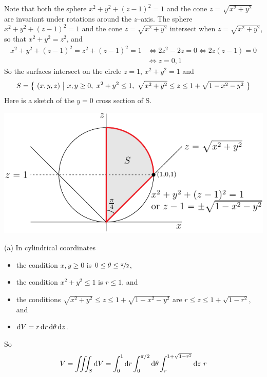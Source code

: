 \begin{solution}
Note that both the sphere $x^2+y^2+(z-1)^2=1$
and the cone $z=\sqrt{x^2+y^2}$  are invariant under rotations
around the $z$--axis. The sphere $x^2 + y^2 + (z-1)^2 = 1$ 
and the cone $z = \sqrt{x^2 + y^2}$ intersect when $z=\sqrt{x^2+y^2}$, so that
$x^2+y^2=z^2$, and
\begin{align*}
x^2 + y^2 + (z-1)^2 = z^2+(z-1)^2=1
&\iff 2z^2-2z=0
\iff 2z(z-1)=0 \\
&\iff z=0,1
\end{align*}
So the surfaces intersect on the circle $z=1$,
$x^2+y^2=1$ and
\begin{equation*}
S = \Set{(x,y,z)}{x,y\ge 0,\  x^2+y^2\le 1,\ 
         \sqrt{x^2+y^2}\le z\le 1+\sqrt{1-x^2-y^2}}
\end{equation*}
Here is a sketch of the $y=0$ cross section of S.
\begin{center}
     \includegraphics{fig/OE16D_7.pdf}
\end{center}

(a) In cylindrical coordinates
\begin{itemize}
\item
the condition $x,y\ge 0$ is $0\le\theta\le\nicefrac{\pi}{2}$,
\item
the condition $x^2+y^2\le 1$ is $r\le 1$, and
\item
the conditions $\sqrt{x^2+y^2}\le z\le 1+\sqrt{1-x^2-y^2}$
are $r\le z\le 1+\sqrt{1-r^2}$, and
\item
$\mathrm{d}V = r\,\mathrm{d}r\,\mathrm{d}\theta\,\mathrm{d}z$.
\end{itemize}
So
\begin{align*}
V = \iiint_S\mathrm{d}V
  = \int_0^1\mathrm{d}r \int_0^{\pi/2}\mathrm{d}\theta\int_r^{1+\sqrt{1-r^2}}\mathrm{d}z
     \ r
\end{align*}


\end{solution}
